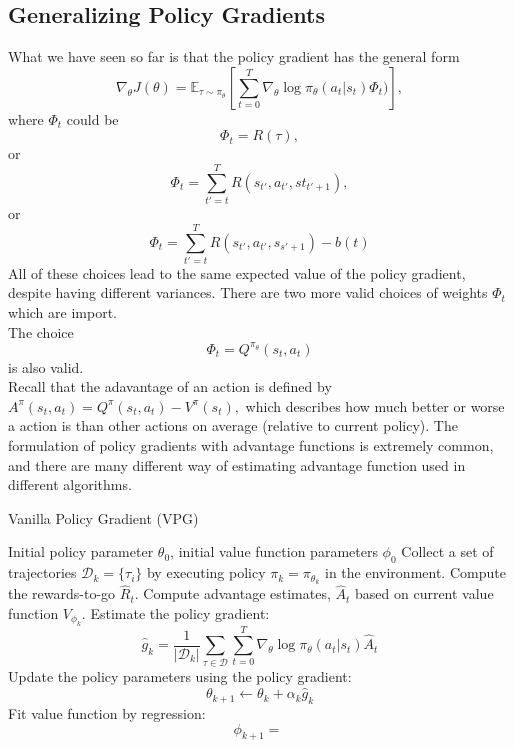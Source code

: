 \subsection{Generalizing Policy Gradients }
What we have seen so far is that the policy gradient has the general form
$$
    \nabla_{\theta} J(\theta) = \mathbb{E}_{\tau \sim \pi_\theta} \left[\sum_{t=0}^{T} \nabla_{\theta} \log \pi_{\theta}(a_t|s_t)  \Phi_{t}) \right],
$$
where $\Phi_{t}$ could be 
$$
\Phi_t = R(\tau),
$$
or 
$$
\Phi_t = \sum_{t' = t}^{T}R(s_{t'}, a_{t'}, st_{t' +1}),
$$
or
$$
\Phi_t = \sum_{t' = t}^{T}R(s_{t'}, a_{t'}, s_{s' + 1}) - b(t)
$$
All of these choices lead to the same expected value of the policy gradient, despite having different variances. There are two more valid choices of weights $\Phi_t$ which are import.\\
 The choice
$$
\Phi_t = Q^{\pi_{\theta}}(s_t, a_t) 
$$
is also valid. \\ 
 Recall that the adavantage of an action is defined by 
$
A^{\pi}(s_t, a_t) = Q^{\pi}(s_t, a_t) - V^{\pi}(s_t),
$
which describes how much better or worse a action is than other actions on average (relative to current policy). The formulation of policy gradients with advantage functions is extremely common, and there are many different way of estimating advantage function used in different algorithms. 


\begin{algorithm}
\caption{Vanilla Policy Gradient (VPG)}
\begin{algorithmic}[1]
\Require Initial policy parameter $\theta_0$, initial value function parameters $\phi_0$
    \State Collect a set of trajectories $\mathcal{D}_k = \{ \tau_i \}$ by executing policy $\pi_{k} = \pi_{\theta_k}$ in the environment.
    \State Compute the rewards-to-go $\hat{R}_t$.
    \State Compute advantage estimates, $\hat{A}_t$ based on current value function $V_{\phi_k}$. 
    \State Estimate the policy gradient:
    \[ \hat{g}_k = \frac{1}{|\mathcal{D}_k|} \sum_{\tau \in \mathcal{D}} \sum_{t=0}^{T} \nabla_{\theta} \log \pi_{\theta}(a_t|s_t) \hat{A}_t \]
    \State Update the policy parameters using the policy gradient:
    \[ \theta_{k+1} \leftarrow \theta_k + \alpha_k \hat{g}_k \]
    \State Fit value function by regression:
    $$
    \phi_{k+1} = \
    $$
\EndFor
\end{algorithmic}
\end{algorithm}
